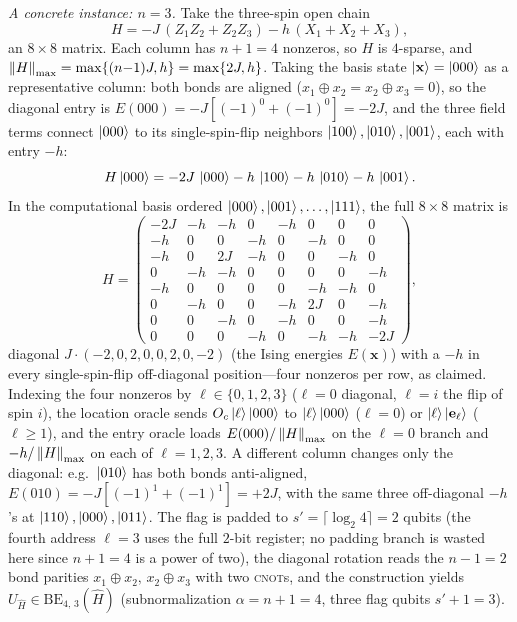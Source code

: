 \begin{example}
\emph{A concrete instance: $n=3$.} Take the three-spin open chain
\[
  H=-J\,(Z_1Z_2+Z_2Z_3)-h\,(X_1+X_2+X_3),
\]
an $8\times8$ matrix. Each column has $n{+}1=4$ nonzeros, so $H$ is $4$-sparse, and
$\left\lVert H \right\rVert_{\max}=\max\{(n{-}1)J,h\}=\max\{2J,h\}$. Taking the basis state
$\ket{\mathbf x}=\ket{000}$ as a representative column: both bonds are aligned
($x_1\oplus x_2=x_2\oplus x_3=0$), so the diagonal entry is
$E(000)=-J[(-1)^0+(-1)^0]=-2J$, and the three field terms connect $\ket{000}$ to its
single-spin-flip neighbors $\ket{100},\ket{010},\ket{001}$, each with entry $-h$:
\[
  H\ket{000}=-2J\,\ket{000}-h\,\ket{100}-h\,\ket{010}-h\,\ket{001}.
\]
In the computational basis ordered $\ket{000},\ket{001},\dots,\ket{111}$, the full
$8\times8$ matrix is
\[
  H=\begin{pmatrix}
    -2J & -h  & -h  & 0   & -h  & 0   & 0   & 0  \\
    -h  & 0   & 0   & -h  & 0   & -h  & 0   & 0  \\
    -h  & 0   & 2J  & -h  & 0   & 0   & -h  & 0  \\
    0   & -h  & -h  & 0   & 0   & 0   & 0   & -h \\
    -h  & 0   & 0   & 0   & 0   & -h  & -h  & 0  \\
    0   & -h  & 0   & 0   & -h  & 2J  & 0   & -h \\
    0   & 0   & -h  & 0   & -h  & 0   & 0   & -h \\
    0   & 0   & 0   & -h  & 0   & -h  & -h  & -2J
  \end{pmatrix},
\]
diagonal $J\cdot(-2,0,2,0,0,2,0,-2)$ (the Ising energies $E(\mathbf x)$) with a $-h$ in
every single-spin-flip off-diagonal position---four nonzeros per row, as claimed.
Indexing the four nonzeros by $\ell\in\{0,1,2,3\}$ ($\ell=0$ diagonal, $\ell=i$ the flip
of spin $i$), the location oracle sends $O_c\ket\ell\ket{000}$ to $\ket\ell\ket{000}$
($\ell=0$) or $\ket\ell\ket{\mathbf e_\ell}$ ($\ell\ge1$), and the entry oracle loads
$E(000)/\left\lVert H \right\rVert_{\max}$ on the $\ell=0$ branch and $-h/\left\lVert H \right\rVert_{\max}$ on each of
$\ell=1,2,3$. A different column changes only the diagonal: e.g.\ $\ket{010}$ has both
bonds anti-aligned, $E(010)=-J[(-1)^1+(-1)^1]=+2J$, with the same three off-diagonal
$-h$'s at $\ket{110},\ket{000},\ket{011}$. The flag is padded to
$s'=\lceil\log_2 4\rceil=2$ qubits (the fourth address $\ell=3$ uses the full
$2$-bit register; no padding branch is wasted here since $n{+}1=4$ is a power of two),
the diagonal rotation reads the $n{-}1=2$ bond parities $x_1\oplus x_2,\,x_2\oplus x_3$
with two \textsc{cnot}s, and the construction yields
$U_{\hat H}\in\mathrm{BE}_{4,\,3}(\hat H)$ (subnormalization $\alpha=n{+}1=4$, three flag
qubits $s'{+}1=3$).


\end{example}
